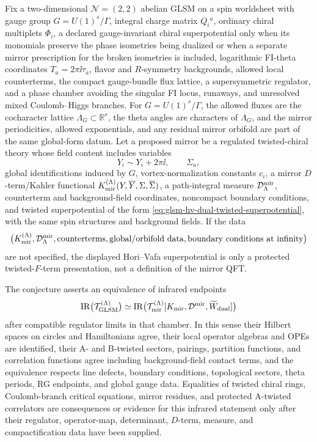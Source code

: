 \begin{conjecture}
\label{conj:abelian-glsm-hori-vafa-mirror-qft}
Fix a two-dimensional \(\mathcal N=(2,2)\) abelian GLSM on a spin worldsheet
with gauge group \(G=U(1)^s/\Gamma\), integral charge matrix \(Q_i{}^a\),
ordinary chiral multiplets \(\Phi_i\), a declared gauge-invariant chiral
superpotential only when its monomials preserve the phase isometries being
dualized or when a separate mirror prescription for the broken isometries is
included, logarithmic FI-theta coordinates \(T_a=2\pi\ii\tau_a\), flavor and
\(R\)-symmetry backgrounds, allowed local counterterms, the compact
gauge-bundle flux lattice, a supersymmetric regulator, and a phase chamber
avoiding the singular FI locus, runaways, and unresolved mixed
Coulomb--Higgs branches.
For \(G=U(1)^s/\Gamma\), the allowed fluxes are the cocharacter lattice
\(\Lambda_G\subset \mathbb R^s\), the theta angles are characters of
\(\Lambda_G\), and the mirror periodicities, allowed exponentials, and any
residual mirror orbifold are part of the same global-form datum.
Let a proposed mirror be a regulated twisted-chiral theory whose field
content includes variables
\[
  Y_i\sim Y_i+2\pi\ii,\qquad \Sigma_a,
\]
global identifications induced by \(G\), vortex-normalization constants
\(c_i\), a mirror \(D\)-term/Kahler functional
\(K_{\rm mir}^{(\Lambda)}(Y,\overline Y,\Sigma,\overline\Sigma)\), a
path-integral measure \({\mathcal D}_{\Lambda}^{\rm mir}\), counterterm and
background-field coordinates, noncompact boundary conditions, and twisted
superpotential of the form
\eqref{eq:glsm-hv-dual-twisted-superpotential}, with the same spin structures
and background fields.  If the data
\[
  \bigl(
  K_{\rm mir}^{(\Lambda)},
  {\mathcal D}_{\Lambda}^{\rm mir},
  \hbox{counterterms},
  \hbox{global/orbifold data},
  \hbox{boundary conditions at infinity}
  \bigr)
\]
are not specified, the displayed Hori--Vafa superpotential is only a
protected twisted-\(F\)-term presentation, not a definition of the mirror QFT.

The conjecture asserts an equivalence of infrared endpoints
\[
  {\rm IR}\bigl({\mathcal T}_{\rm GLSM}^{(\Lambda)}\bigr)
  \simeq
  {\rm IR}\bigl({\mathcal T}_{\rm mir}^{(\Lambda)}
  [K_{\rm mir},{\mathcal D}^{\rm mir},\widetilde W_{\rm dual}]\bigr)
\]
after compatible regulator limits in that chamber.  In this sense their
Hilbert spaces on circles and Hamiltonians agree, their local operator
algebras and OPEs are identified, their A- and B-twisted sectors, pairings,
partition functions, and correlation functions agree including
background-field contact terms, and the equivalence respects line defects,
boundary conditions, topological sectors, theta periods, RG endpoints, and
global gauge data.  Equalities of twisted chiral rings, Coulomb-branch
critical equations, mirror residues, and protected A-twisted correlators are
consequences or evidence for this infrared statement only after their
regulator, operator-map, determinant, \(D\)-term, measure, and
compactification data have been supplied.
\end{conjecture}

